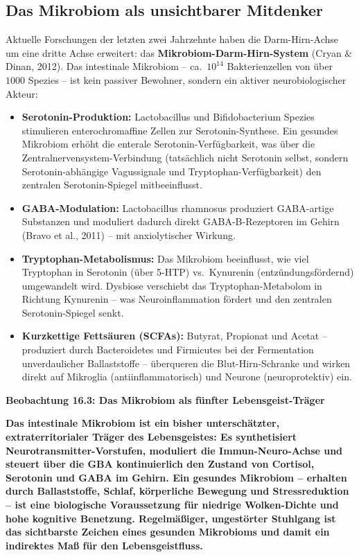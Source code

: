 ﻿\documentclass[12pt,a4paper]{report}
\theoremstyle{plain}
\theoremstyle{definition}
\theoremstyle{remark}
\begin{document}
	\subsection{Das Mikrobiom als unsichtbarer Mitdenker}

	Aktuelle Forschungen der letzten zwei Jahrzehnte haben die
	Darm-Hirn-Achse um eine dritte Achse erweitert:
	das \textbf{Mikrobiom-Darm-Hirn-System} (Cryan \& Dinan, 2012).
	Das intestinale Mikrobiom -- ca.\ $10^{14}$ Bakterienzellen
	von über $1000$ Spezies -- ist kein passiver Bewohner,
	sondern ein aktiver neurobiologischer Akteur:

	\begin{itemize}
		\item \textbf{Serotonin-Produktion:}
		Lactobacillus und Bifidobacterium Spezies stimulieren
		enterochromaffine Zellen zur Serotonin-Synthese.
		Ein gesundes Mikrobiom erhöht die enterale
		Serotonin-Verfügbarkeit, was über die Zentralnervensystem-Verbindung
		(tatsächlich nicht Serotonin selbst, sondern Serotonin-abhängige
		Vagussignale und Tryptophan-Verfügbarkeit) den zentralen
		Serotonin-Spiegel mitbeeinflusst.
		\item \textbf{GABA-Modulation:}
		Lactobacillus rhamnosus produziert GABA-artige Substanzen
		und moduliert dadurch direkt GABA-B-Rezeptoren im Gehirn
		(Bravo et al., 2011) -- mit anxiolytischer Wirkung.
		\item \textbf{Tryptophan-Metabolismus:}
		Das Mikrobiom beeinflusst, wie viel Tryptophan in Serotonin
		(über 5-HTP) vs.\ Kynurenin (entzündungsfördernd)
		umgewandelt wird. Dysbiose verschiebt das Tryptophan-Metabolom
		in Richtung Kynurenin -- was Neuroinflammation fördert und
		den zentralen Serotonin-Spiegel senkt.
		\item \textbf{Kurzkettige Fettsäuren (SCFAs):}
		Butyrat, Propionat und Acetat -- produziert durch
		Bacteroidetes und Firmicutes bei der Fermentation
		unverdaulicher Ballaststoffe -- überqueren die Blut-Hirn-Schranke
		und wirken direkt auf Mikroglia (antiinflammatorisch) und
		Neurone (neuroprotektiv) ein.
	\end{itemize}

	
	\noindent\textbf{Beobachtung 16.3: Das Mikrobiom als fünfter Lebensgeist-Träger}

		\textbf{Das intestinale Mikrobiom ist ein bisher unterschätzter,
		extraterritorialer Träger des Lebensgeistes: Es synthetisiert
		Neurotransmitter-Vorstufen, moduliert die Immun-Neuro-Achse
		und steuert über die GBA kontinuierlich den Zustand von
		Cortisol, Serotonin und GABA im Gehirn. Ein gesundes Mikrobiom
		-- erhalten durch Ballaststoffe, Schlaf, körperliche Bewegung
		und Stressreduktion -- ist eine biologische Voraussetzung
		für niedrige Wolken-Dichte und hohe kognitive Benetzung.
		Regelmäßiger, ungestörter Stuhlgang ist das sichtbarste
		Zeichen eines gesunden Mikrobioms und damit ein
		indirektes Maß für den Lebensgeistfluss.}
\end{document}
